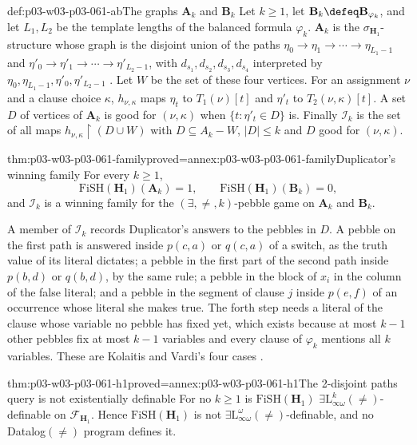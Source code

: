 \begin{hbdefinition}{def:p03-w03-p03-061-ab}{The graphs \(\mathbf A_k\) and \(\mathbf B_k\)}
Let \(k\ge1\), let \(\mathbf B_k\defeq\mathbf B_{\varphi_k}\), and let
\(L_1,L_2\) be the template lengths of the balanced formula \(\varphi_k\).
\(\mathbf A_k\) is the \(\sigma_{\mathbf H_1}\)-structure whose graph is the
disjoint union of the paths \(\eta_0\to\eta_1\to\cdots\to\eta_{L_1-1}\) and
\(\eta'_0\to\eta'_1\to\cdots\to\eta'_{L_2-1}\), with \(d_{s_1},d_{s_2},d_{s_3},
d_{s_4}\) interpreted by \(\eta_0,\eta_{L_1-1},\eta'_0,\eta'_{L_2-1}\)
\cite[pp.~34--35]{KolaitisVardi1995DatalogManuscript}. Let \(W\) be the set
of these four vertices. For an assignment \(\nu\) and a clause choice
\(\kappa\), \(h_{\nu,\kappa}\) maps \(\eta_t\) to \(T_1(\nu)[t]\) and
\(\eta'_t\) to \(T_2(\nu,\kappa)[t]\). A set \(D\) of vertices of
\(\mathbf A_k\) is good for \((\nu,\kappa)\) when
\(\{t:\eta'_t\in D\}\) is. Finally \(\mathcal I_k\) is the set of all maps
\(h_{\nu,\kappa}\restriction(D\cup W)\) with \(D\subseteq A_k-W\),
\(|D|\le k\) and \(D\) good for \((\nu,\kappa)\).
\end{hbdefinition}

\begin{hbtheorem}{thm:p03-w03-p03-061-family}{proved=annex:p03-w03-p03-061-family}{Duplicator's winning family}
For every \(k\ge1\),
\[
 \mathrm{FiSH}(\mathbf H_1)(\mathbf A_k)=1,\qquad
 \mathrm{FiSH}(\mathbf H_1)(\mathbf B_k)=0,
\]
and \(\mathcal I_k\) is a winning family for the \((\exists,\neq,k)\)-pebble game on \(\mathbf A_k\)
and \(\mathbf B_k\).
\end{hbtheorem}

A member of \(\mathcal I_k\) records Duplicator's answers to the pebbles in
\(D\). A pebble on the first path is answered inside \(p(c,a)\) or
\(q(c,a)\) of a switch, as the truth value of its literal dictates; a pebble
in the first part of the second path inside \(p(b,d)\) or \(q(b,d)\), by the
same rule; a pebble in the block of \(x_i\) in the column of the false
literal; and a pebble in the segment of clause \(j\) inside \(p(e,f)\) of an
occurrence whose literal she makes true. The forth step needs a literal of
the clause whose variable no pebble has fixed yet, which exists because at
most \(k-1\) other pebbles fix at most \(k-1\) variables and every clause of
\(\varphi_k\) mentions all \(k\) variables. These are Kolaitis and Vardi's
four cases \cite[pp.~36--38]{KolaitisVardi1995DatalogManuscript}.

\begin{hbtheorem}{thm:p03-w03-p03-061-h1}{proved=annex:p03-w03-p03-061-h1}{The 2-disjoint paths query is not existentially definable}
For no \(k\ge1\) is \(\mathrm{FiSH}(\mathbf H_1)\)
\(\exists\mathrm L^k_{\infty\omega}(\neq)\)-definable on
\(\mathcal F_{\mathbf H_1}\). Hence \(\mathrm{FiSH}(\mathbf H_1)\) is not
\(\exists\mathrm L^\omega_{\infty\omega}(\neq)\)-definable, and no
Datalog\((\neq)\) program defines it.
\end{hbtheorem}

